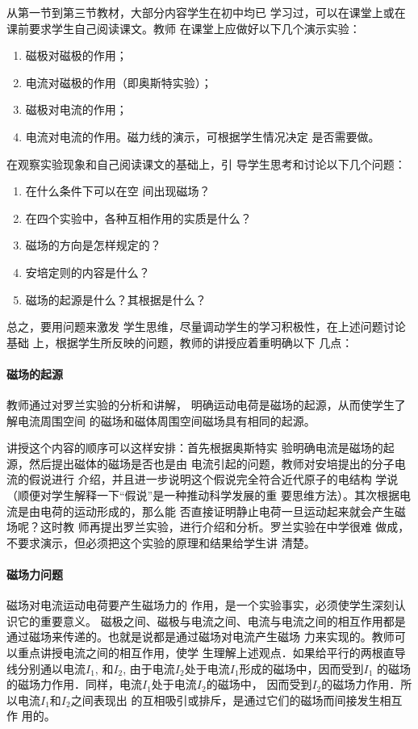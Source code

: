 从第一节到第三节教材，大部分内容学生在初中均已
学习过，可以在课堂上或在课前要求学生自己阅读课文。教师
在课堂上应做好以下几个演示实验：
\begin{enumerate}
\item 磁极对磁极的作用；
\item 电流对磁极的作用（即奥斯特实验）；    \item 磁极对电流的作用；
\item 电流对电流的作用。磁力线的演示，可根据学生情况决定
是否需要做。
\end{enumerate}
在观察实验现象和自己阅读课文的基础上，引
导学生思考和讨论以下几个问题：
\begin{enumerate}
\item 在什么条件下可以在空
间出现磁场？    \item 在四个实验中，各种互相作用的实质是什么？
\item 磁场的方向是怎样规定的？    \item 安培定则的内容是什么？   
 \item 
磁场的起源是什么？其根据是什么？
\end{enumerate}
总之，要用问题来激发
学生思维，尽量调动学生的学习积极性，在上述问题讨论基础
上，根据学生所反映的问题，教师的讲授应着重明确以下
几点：

\paragraph{磁场的起源}
教师通过对罗兰实验的分析和讲解，
明确运动电荷是磁场的起源，从而使学生了解电流周围空间
的磁场和磁体周围空间磁场具有相同的起源。

讲授这个内容的顺序可以这样安排：首先根据奥斯特实
验明确电流是磁场的起源，然后提出磁体的磁场是否也是由
电流引起的问题，教师对安培提出的分子电流的假说进行
介绍，并且进一步说明这个假说完全符合近代原子的电结构
学说（顺便对学生解释一下“假说”是一种推动科学发展的重
要思维方法）。其次根据电流是由电荷的运动形成的，那么能
否直接证明静止电荷一旦运动起来就会产生磁场呢？这时教
师再提出罗兰实验，进行介绍和分析。罗兰实验在中学很难
做成，不要求演示，但必须把这个实验的原理和结果给学生讲
清楚。

\paragraph{磁场力问题}
磁场对电流运动电荷要产生磁场力的
作用，是一个实验事实，必须使学生深刻认识它的重要意义。
磁极之间、磁极与电流之间、电流与电流之间的相互作用都是
通过磁场来传递的。也就是说都是通过磁场对电流产生磁场
力来实现的。教师可以重点讲授电流之间的相互作用，使学
生理解上述观点．如果给平行的两根直导线分别通以电流$I_1$,
和$I_2$, 由于电流$I_2$处于电流$I_1$形成的磁场中，因而受到$I_1$
的磁场的磁场力作用．同样，电流$I_1$处于电流$I_2$的磁场中，
因而受到$I_2$的磁场力作用．所以电流$I_1$和$I_2$之间表现出
的互相吸引或排斥，是通过它们的磁场而间接发生相互作
用的。

